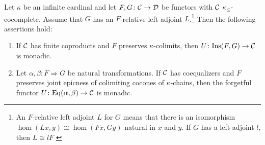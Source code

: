 \begin{theorem}\label{thm:BigMonadicity}
Let $\kappa$ be an infinite cardinal and let $F,G\colon \mathcal{C}\to \mathcal{D}$ be functors with $\mathcal{C}$ $\kappa_\leq$-cocomplete. Assume that $G$ has an $F$-relative left adjoint $L$.\footnote{An $F$-relative left adjoint $L$ for $G$ means that there is an isomorphism $\hom(Lx,y)\cong\hom(Fx,Gy)$ natural in $x$ and $y$. If $G$ has a left adjoint $l$, then $L \cong lF$ \cite{ulmerPropertiesDenseRelative1968}} Then the following assertions hold:
\begin{enumerate}
    \item If $\mathcal{C}$ has finite coproducts and $F$ preserves $\kappa$-colimits, then $U\colon \mathrm{Ins}(F,G)\to \mathcal{C}$ is monadic.
    \item Let $\alpha,\beta\colon F\Rightarrow G$ be natural transformations. If $\mathcal{C}$ has coequalizers and $F$ preserves joint epicness of colimiting cocones of $\kappa$-chains, then the forgetful functor $U\colon \mathrm{Eq}(\alpha,\beta)\to \mathcal{C}$ is monadic.
\end{enumerate}
\end{theorem}
